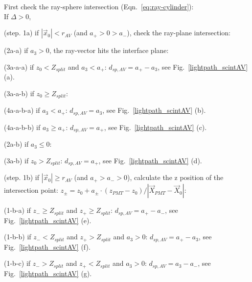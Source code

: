 \begin{algorithm}
	First check the ray-sphere intersection (Eqn.~\ref{eq:ray-cylinder}):\\
	If {$\Delta>0$}, 
	
	\hspace{2mm}(step. 1a) if $|\vec{x}_0|<r_{AV}$ (and $a_+>0>a_-$), check the ray-plane intersection:
	
	\hspace{4mm}(2a-a) if $a_3>0$, the ray-vector hits the interface plane: 
	
	\hspace{6mm}(3a-a-a) if $z_0<Z_{split}$ and $a_3<a_+$: $d_{sp,AV}=a_+-a_3$, see Fig.~\ref{lightpath_scintAV} (a).
	
	\hspace{6mm}(3a-a-b) if $z_0\geq Z_{split}$:
	
	\hspace{8mm}(4a-a-b-a) if $a_3<a_+$:  $d_{sp,AV}=a_3$, see Fig.~\ref{lightpath_scintAV} (b). 
	
	\hspace{8mm}(4a-a-b-b) if $a_3\geq a_+$:  $d_{sp,AV}=a_+$, see Fig.~\ref{lightpath_scintAV} (c).
	
	\hspace{4mm}(2a-b) if $a_3\leq0$:
	
	\hspace{6mm}(3a-b) if $z_0>Z_{split}$: $d_{sp,AV}=a_+$, see Fig.~\ref{lightpath_scintAV} (d).
	
	\hspace{2mm}(step. 1b) if $|\vec{x}_0|\geq r_{AV}$ (and $a_+>a_->0$), calculate the z position of the intersection point: $z_{\pm}=z_0+a_\pm\cdot(z_{PMT}-z_0)/|\vec{X}_{PMT}-\vec{X}_0|$:
	
	\hspace{4mm}(1-b-a) if $z_- \geq Z_{split}$ and $z_+\geq Z_{split}$: $d_{sp,AV} = a_+ - a_-$, see Fig.~\ref{lightpath_scintAV} (e).
	
	\hspace{4mm}(1-b-b) if $z_-< Z_{split}$ and $z_+> Z_{split}$ and $a_3>0$: $d_{sp,AV} = a_+ - a_3$, see Fig.~\ref{lightpath_scintAV} (f).
	
	\hspace{4mm}(1-b-c) if $z_->Z_{split}$ and $z_+<Z_{split}$ and $a_3>0$: $d_{sp,AV}= a_3 - a_-$, see Fig.~\ref{lightpath_scintAV} (g).
\end{algorithm}

